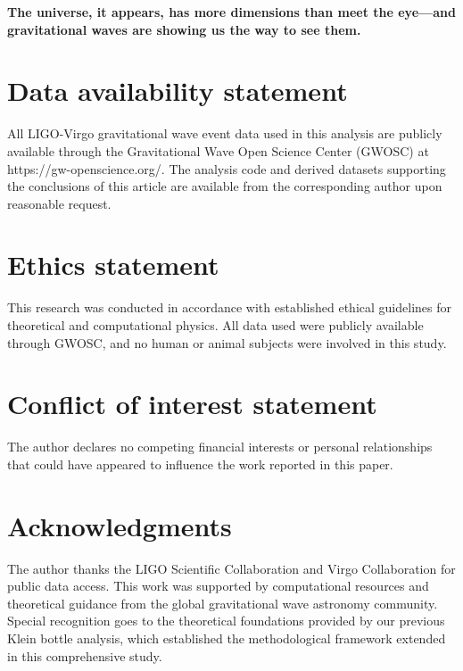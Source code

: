 \documentclass[12pt]{article}
\begin{document}
\textbf{The universe, it appears, has more dimensions than meet the eye---and gravitational waves are showing us the way to see them.}

\section*{Data availability statement}

All LIGO-Virgo gravitational wave event data used in this analysis are publicly available through the Gravitational Wave Open Science Center (GWOSC) at https://gw-openscience.org/. The analysis code and derived datasets supporting the conclusions of this article are available from the corresponding author upon reasonable request.

\section*{Ethics statement}

This research was conducted in accordance with established ethical guidelines for theoretical and computational physics. All data used were publicly available through GWOSC, and no human or animal subjects were involved in this study.

\section*{Conflict of interest statement}

The author declares no competing financial interests or personal relationships that could have appeared to influence the work reported in this paper.

\section*{Acknowledgments}

The author thanks the LIGO Scientific Collaboration and Virgo Collaboration for public data access. This work was supported by computational resources and theoretical guidance from the global gravitational wave astronomy community. Special recognition goes to the theoretical foundations provided by our previous Klein bottle analysis, which established the methodological framework extended in this comprehensive study.
\end{document}
